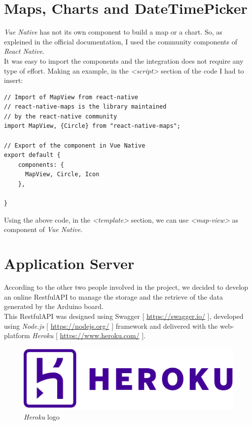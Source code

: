 \section{Maps, Charts and DateTimePicker}
\textit{Vue Native} has not its own component to build a map or a chart. So, as expleined in the official documentation, I used the community components of \textit{React Native}.\\

It was easy to import the components and the integration does not require any type of effort. Making an example, in the \textit{<script>} section of the code I had to insert:

\medskip
\begin{lstlisting}[style=htmlcssjs]
// Import of MapView from react-native
// react-native-maps is the library maintained
// by the react-native community
import MapView, {Circle} from "react-native-maps";

// Export of the component in Vue Native
export default {
    components: {
      MapView, Circle, Icon
    },
    
}
\end{lstlisting}

Using the above code, in the \textit{<template>} section, we can use \textit{<map-view>} as component of \textit{Vue Native}.

\section{Application Server}
According to the other two people involved in the project, we decided to develop an online RestfulAPI to manage the storage and the retrieve of the data generated by the Arduino board.\\

This RestfulAPI was designed using Swagger [ \url{https://swagger.io/} ], developed using \textit{Node.js} [ \url{https://nodejs.org/} ] framework and delivered with the web-platform \textit{Heroku} [ \url{https://www.heroku.com/} ].\\

\begin{figure}[h]
\begin{center}
  \includegraphics[width=.5\textwidth]{img/logos/logo_heroku.png}
  \hspace{0.05\linewidth}
  \centering
  \caption{\textit{Heroku} logo}
  \label{img:logo_heroku}
\end{center}
\end{figure}

